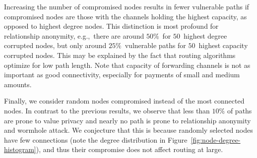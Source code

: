 Increasing the number of compromised nodes results in fewer vulnerable paths if compromised nodes are those with the channels holding the highest capacity, as opposed to highest degree nodes.
This distinction is most profound for relationship anonymity, e.g.,~there are around $50\%$~for $50$~highest degree corrupted nodes, but only around $25\%$~vulnerable paths for $50$~highest capacity corrupted nodes.
This may be explained by the fact that routing algorithms optimize for low path length.
Note that capacity of forwarding channels is not as important as good connectivity, especially for payments of small and medium amounts.

Finally, we consider random nodes compromised instead of the most connected nodes.
In contrast to the previous results, we observe that less than $10\%$ of paths are prone to value privacy and nearly no path is prone 
to relationship anonymity and wormhole attack.
We conjecture that this is because randomly selected nodes have few connections (note the degree distribution in Figure~\ref{fig:node-degree-histogram}), and thus their compromise does not affect routing at large.


